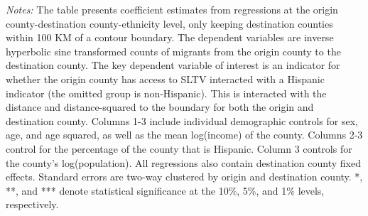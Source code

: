 \begin{table}[!h]
{\begin{threeparttable}
\begin{tablenotes}[flushleft]
				\item \textit{Notes:} The table presents coefficient estimates from regressions at the origin county-destination county-ethnicity level, only keeping destination counties within 100 KM of a contour boundary. The dependent variables are inverse hyperbolic sine transformed counts of migrants from the origin county to the destination county. The key dependent variable of interest is an indicator for whether the origin county has access to SLTV interacted with a Hispanic indicator (the omitted group is non-Hispanic). This is interacted with the distance and distance-squared to the boundary for both the origin and destination county. Columns 1-3 include individual demographic controls for sex, age, and age squared, as well as the mean log(income) of the county. Columns 2-3 control for the percentage of the county that is Hispanic. Column 3 controls for the county's log(population). All regressions also contain destination county fixed effects. Standard errors are two-way clustered by origin and destination county. *, **, and *** denote statistical significance at the 10\%, 5\%, and 1\% levels, respectively.
			\end{tablenotes}
		\end{threeparttable}
	}
\end{table}